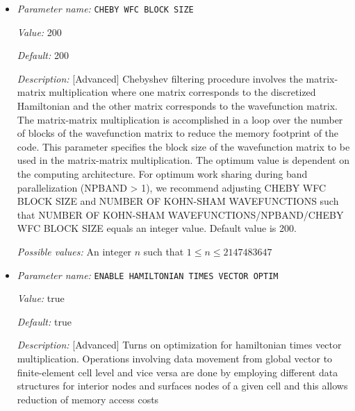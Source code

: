 \begin{itemize}
{\it Possible values:} A floating point number $v$ such that $0 \leq v \leq 2000$
\item {\it Parameter name:} {\tt CHEBY WFC BLOCK SIZE}
\label{parameters:SCF parameters/Eigen_2dsolver parameters/CHEBY WFC BLOCK SIZE}
\label{parameters:SCF_20parameters/Eigen_2dsolver_20parameters/CHEBY_20WFC_20BLOCK_20SIZE}


{\it Value:} 200


{\it Default:} 200


{\it Description:} [Advanced] Chebyshev filtering procedure involves the matrix-matrix multiplication where one matrix corresponds to the discretized Hamiltonian and the other matrix corresponds to the wavefunction matrix. The matrix-matrix multiplication is accomplished in a loop over the number of blocks of the wavefunction matrix to reduce the memory footprint of the code. This parameter specifies the block size of the wavefunction matrix to be used in the matrix-matrix multiplication. The optimum value is dependent on the computing architecture. For optimum work sharing during band parallelization (NPBAND > 1), we recommend adjusting CHEBY WFC BLOCK SIZE and NUMBER OF KOHN-SHAM WAVEFUNCTIONS such that NUMBER OF KOHN-SHAM WAVEFUNCTIONS/NPBAND/CHEBY WFC BLOCK SIZE equals an integer value. Default value is 200.


{\it Possible values:} An integer $n$ such that $1\leq n \leq 2147483647$
\item {\it Parameter name:} {\tt ENABLE HAMILTONIAN TIMES VECTOR OPTIM}
\label{parameters:SCF parameters/Eigen_2dsolver parameters/ENABLE HAMILTONIAN TIMES VECTOR OPTIM}
\label{parameters:SCF_20parameters/Eigen_2dsolver_20parameters/ENABLE_20HAMILTONIAN_20TIMES_20VECTOR_20OPTIM}


{\it Value:} true


{\it Default:} true


{\it Description:} [Advanced] Turns on optimization for hamiltonian times vector multiplication. Operations involving data movement from global vector to finite-element cell level and vice versa are done by employing different data structures for interior nodes and surfaces nodes of a given cell and this allows reduction of memory access costs



\end{itemize}
